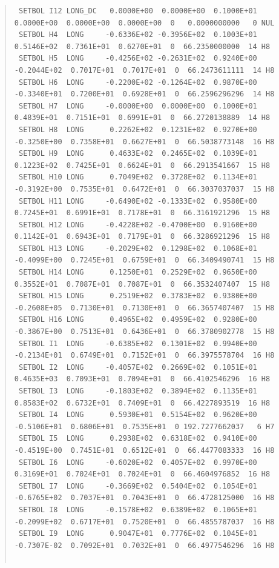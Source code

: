 \documentclass[twoside,11pt]{article}
\newenvironment{myquote}{\begin{quote}\begin{small}}{\end{small}\end{quote}}
\renewcommand{\_}{\texttt{\symbol{95}}}
\begin{document}
\begin{landscape}
\begin{myquote}
\begin{verbatim}
 SETBOL I12 LONG_DC   0.0000E+00  0.0000E+00  0.1000E+01  0.0000E+00  0.0000E+00  0.0000E+00  0   0.0000000000   0 NUL        
 SETBOL H4  LONG     -0.6336E+02 -0.3956E+02  0.1003E+01  0.5146E+02  0.7361E+01  0.6270E+01  0  66.2350000000  14 H8         
 SETBOL H5  LONG     -0.4256E+02 -0.2631E+02  0.9240E+00 -0.2044E+02  0.7017E+01  0.7017E+01  0  66.2473611111  14 H8         
 SETBOL H6  LONG     -0.2200E+02 -0.1264E+02  0.9870E+00 -0.3340E+01  0.7200E+01  0.6928E+01  0  66.2596296296  14 H8         
 SETBOL H7  LONG     -0.0000E+00  0.0000E+00  0.1000E+01  0.4839E+01  0.7151E+01  0.6991E+01  0  66.2720138889  14 H8         
 SETBOL H8  LONG      0.2262E+02  0.1231E+02  0.9270E+00 -0.3250E+00  0.7358E+01  0.6627E+01  0  66.5038773148  16 H8         
 SETBOL H9  LONG      0.4633E+02  0.2465E+02  0.1039E+01  0.1223E+02  0.7425E+01  0.6624E+01  0  66.2913541667  15 H8         
 SETBOL H10 LONG      0.7049E+02  0.3728E+02  0.1134E+01 -0.3192E+00  0.7535E+01  0.6472E+01  0  66.3037037037  15 H8         
 SETBOL H11 LONG     -0.6490E+02 -0.1333E+02  0.9580E+00  0.7245E+01  0.6991E+01  0.7178E+01  0  66.3161921296  15 H8         
 SETBOL H12 LONG     -0.4228E+02 -0.4700E+00  0.9160E+00  0.1142E+01  0.6943E+01  0.7179E+01  0  66.3286921296  15 H8         
 SETBOL H13 LONG     -0.2029E+02  0.1298E+02  0.1068E+01 -0.4099E+00  0.7245E+01  0.6759E+01  0  66.3409490741  15 H8         
 SETBOL H14 LONG      0.1250E+01  0.2529E+02  0.9650E+00  0.3552E+01  0.7087E+01  0.7087E+01  0  66.3532407407  15 H8         
 SETBOL H15 LONG      0.2519E+02  0.3783E+02  0.9380E+00 -0.2608E+05  0.7130E+01  0.7130E+01  0  66.3657407407  15 H8         
 SETBOL H16 LONG      0.4965E+02  0.4959E+02  0.9280E+00 -0.3867E+00  0.7513E+01  0.6436E+01  0  66.3780902778  15 H8         
 SETBOL I1  LONG     -0.6385E+02  0.1301E+02  0.9940E+00 -0.2134E+01  0.6749E+01  0.7152E+01  0  66.3975578704  16 H8         
 SETBOL I2  LONG     -0.4057E+02  0.2669E+02  0.1051E+01  0.4635E+03  0.7093E+01  0.7094E+01  0  66.4102546296  16 H8         
 SETBOL I3  LONG     -0.1803E+02  0.3894E+02  0.1135E+01  0.8583E+02  0.6732E+01  0.7409E+01  0  66.4227893519  16 H8         
 SETBOL I4  LONG      0.5930E+01  0.5154E+02  0.9620E+00 -0.5106E+01  0.6806E+01  0.7535E+01  0 192.7277662037   6 H7         
 SETBOL I5  LONG      0.2938E+02  0.6318E+02  0.9410E+00 -0.4519E+00  0.7451E+01  0.6512E+01  0  66.4477083333  16 H8         
 SETBOL I6  LONG     -0.6020E+02  0.4057E+02  0.9970E+00  0.3169E+01  0.7024E+01  0.7024E+01  0  66.4604976852  16 H8         
 SETBOL I7  LONG     -0.3669E+02  0.5404E+02  0.1054E+01 -0.6765E+02  0.7037E+01  0.7043E+01  0  66.4728125000  16 H8         
 SETBOL I8  LONG     -0.1578E+02  0.6389E+02  0.1065E+01 -0.2099E+02  0.6717E+01  0.7520E+01  0  66.4855787037  16 H8         
 SETBOL I9  LONG      0.9047E+01  0.7776E+02  0.1045E+01 -0.7307E-02  0.7092E+01  0.7032E+01  0  66.4977546296  16 H8         
												

\end{verbatim}
\end{myquote}
\end{landscape}
\end{document}
